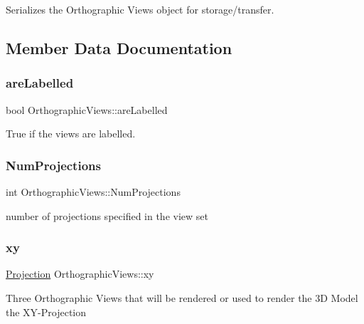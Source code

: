 Serializes the Orthographic Views object for storage/transfer. 



\subsection{Member Data Documentation}
\mbox{\label{class_orthographic_views_af414df37b5977b4486b8d0351f142a7f}} 
\subsubsection{\texorpdfstring{are\+Labelled}{areLabelled}}
{\footnotesize\ttfamily bool Orthographic\+Views\+::are\+Labelled}



True if the views are labelled. 

\mbox{\label{class_orthographic_views_a899ce5fc9774fbf68cd35d2b4bda3d2c}} 
\subsubsection{\texorpdfstring{Num\+Projections}{NumProjections}}
{\footnotesize\ttfamily int Orthographic\+Views\+::\+Num\+Projections}



number of projections specified in the view set 

\mbox{\label{class_orthographic_views_aaa57dea71b11b77101a5d8d2af776917}} 
\subsubsection{\texorpdfstring{xy}{xy}}
{\footnotesize\ttfamily \mbox{\hyperlink{class_projection}{Projection}} Orthographic\+Views\+::xy}

Three Orthographic Views that will be rendered or used to render the 3D Model the X\+Y-\/\+Projection \mbox{\label{class_orthographic_views_a2d66490dec17aef63631491437e30125}} 
